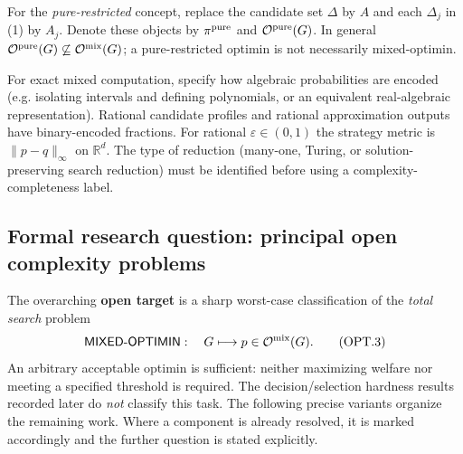 \documentclass[11pt,a4paper]{article}
\providecommand{\D}{\Delta}
\providecommand{\Opt}{\mathcal O}
\providecommand{\RR}{\mathbb R}
\begin{document}
For the \emph{pure-restricted} concept, replace the candidate set $\D$ by $A$ and each $\D_j$ in (1) by $A_j$. Denote these objects by $\pi^{\rm pure}$ and $\Opt^{\rm pure}(G)$. In general
\(\Opt^{\rm pure}(G)\not\subseteq\Opt^{\rm mix}(G)\); a pure-restricted optimin is not necessarily mixed-optimin.

For exact mixed computation, specify how algebraic probabilities are encoded (e.g. isolating intervals and defining polynomials, or an equivalent real-algebraic representation). Rational candidate profiles and rational approximation outputs have binary-encoded fractions. For rational $\varepsilon\in(0,1)$ the strategy metric is $\|p-q\|_\infty$ on $\RR^d$. The type of reduction (many-one, Turing, or solution-preserving search reduction) must be identified before using a complexity-completeness label.

\subsection*{Formal research question: principal open complexity problems}\label{optimin:sec:open}
The overarching \textbf{open target} is a sharp worst-case classification of the \emph{total search} problem
\[
 \mathsf{MIXED\text{-}OPTIMIN}:\quad
 G\longmapsto p\in\Opt^{\rm mix}(G).
\tag{OPT.3}\label{optimin:eq:search}
\]
An arbitrary acceptable optimin is sufficient: neither maximizing welfare nor meeting a specified threshold is required. The decision/selection hardness results recorded later do \emph{not} classify this task. The following precise variants organize the remaining work. Where a component is already resolved, it is marked accordingly and the further question is stated explicitly.
\end{document}

